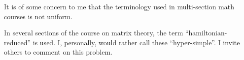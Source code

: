 \documentclass{sample}
\begin{document}
It is of some concern to me that the terminology used in multi-section math courses is not uniform.

In several sections of the course on matrix theory, the term ``hamiltonian-reduced'' is used.
I, personally, would rather call these ``hyper-simple''.
I invite others to comment on this problem.
\end{document}
